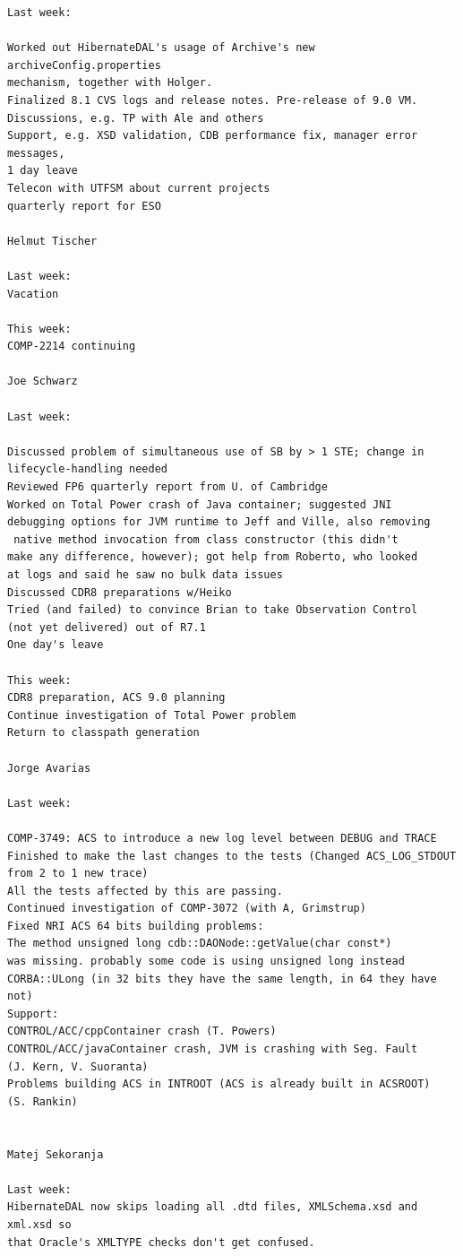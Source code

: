 \begin{verbatim}
Last week: 

Worked out HibernateDAL's usage of Archive's new archiveConfig.properties 
mechanism, together with Holger. 
Finalized 8.1 CVS logs and release notes. Pre-release of 9.0 VM. 
Discussions, e.g. TP with Ale and others 
Support, e.g. XSD validation, CDB performance fix, manager error messages, 
1 day leave 
Telecon with UTFSM about current projects 
quarterly report for ESO 

Helmut Tischer 

Last week: 
Vacation 

This week: 
COMP-2214 continuing 

Joe Schwarz 

Last week: 

Discussed problem of simultaneous use of SB by > 1 STE; change in 
lifecycle-handling needed 
Reviewed FP6 quarterly report from U. of Cambridge 
Worked on Total Power crash of Java container; suggested JNI 
debugging options for JVM runtime to Jeff and Ville, also removing
 native method invocation from class constructor (this didn't 
make any difference, however); got help from Roberto, who looked 
at logs and said he saw no bulk data issues 
Discussed CDR8 preparations w/Heiko 
Tried (and failed) to convince Brian to take Observation Control 
(not yet delivered) out of R7.1 
One day's leave 

This week: 
CDR8 preparation, ACS 9.0 planning 
Continue investigation of Total Power problem 
Return to classpath generation 

Jorge Avarias 

Last week: 

COMP-3749: ACS to introduce a new log level between DEBUG and TRACE 
Finished to make the last changes to the tests (Changed ACS_LOG_STDOUT 
from 2 to 1 new trace) 
All the tests affected by this are passing. 
Continued investigation of COMP-3072 (with A, Grimstrup) 
Fixed NRI ACS 64 bits building problems: 
The method unsigned long cdb::DAONode::getValue(char const*) 
was missing. probably some code is using unsigned long instead 
CORBA::ULong (in 32 bits they have the same length, in 64 they have not) 
Support: 
CONTROL/ACC/cppContainer crash (T. Powers) 
CONTROL/ACC/javaContainer crash, JVM is crashing with Seg. Fault 
(J. Kern, V. Suoranta) 
Problems building ACS in INTROOT (ACS is already built in ACSROOT) 
(S. Rankin) 


Matej Sekoranja 

Last week: 
HibernateDAL now skips loading all .dtd files, XMLSchema.xsd and xml.xsd so 
that Oracle's XMLTYPE checks don't get confused. 


\end{verbatim}
